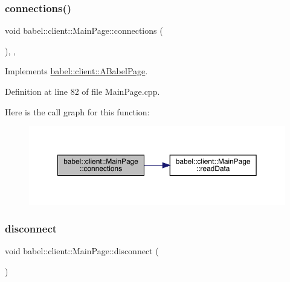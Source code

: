 \mbox{\label{classbabel_1_1client_1_1_main_page_a4c7d94ab3421e1032ed97dc90787f57a}} 
\subsubsection{\texorpdfstring{connections()}{connections()}}
{\footnotesize\ttfamily void babel\+::client\+::\+Main\+Page\+::connections (\begin{DoxyParamCaption}{ }\end{DoxyParamCaption})\hspace{0.3cm}{\ttfamily [override]}, {\ttfamily [protected]}, {\ttfamily [virtual]}}



Implements \mbox{\hyperlink{classbabel_1_1client_1_1_a_babel_page_a37097dfd8ded982074554509e5eab8b0}{babel\+::client\+::\+A\+Babel\+Page}}.



Definition at line 82 of file Main\+Page.\+cpp.

Here is the call graph for this function\+:\nopagebreak
\begin{figure}[H]
\begin{center}
\leavevmode
\includegraphics[width=350pt]{classbabel_1_1client_1_1_main_page_a4c7d94ab3421e1032ed97dc90787f57a_cgraph}
\end{center}
\end{figure}
\mbox{\label{classbabel_1_1client_1_1_main_page_a67ad5c452053020a9c04315d97d01a8b}} 
\subsubsection{\texorpdfstring{disconnect}{disconnect}}
{\footnotesize\ttfamily void babel\+::client\+::\+Main\+Page\+::disconnect (\begin{DoxyParamCaption}{ }\end{DoxyParamCaption})\hspace{0.3cm}{\ttfamily [signal]}}

